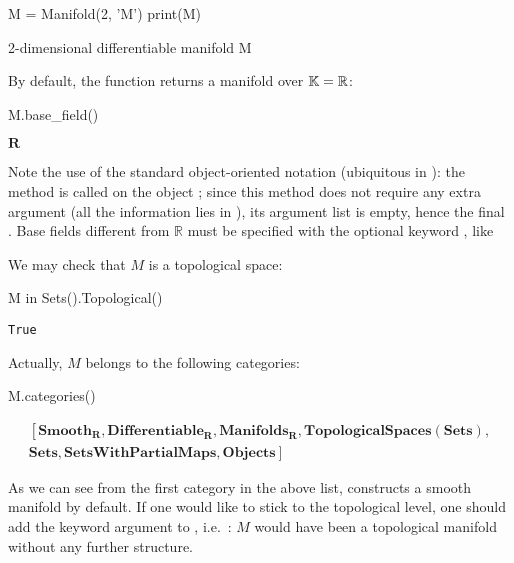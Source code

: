 \begin{NBin}
M = Manifold(2, 'M')
print(M)
\end{NBin}
\begin{NBprint}
2-dimensional differentiable manifold M
\end{NBprint}
By default, the function  returns a manifold over $\mathbb{K}=\mathbb{R}$:
\begin{NBin}
M.base_field()
\end{NBin}
\begin{NBout}
$\mathbf{R}$
\end{NBout}
Note the use of the standard object-oriented notation (ubiquitous in
): the method  is called on the object ;
since this method does not require any extra argument (all the information lies
in ), its argument list is empty, hence the final \code{()}.
Base fields different from $\mathbb{R}$
must be specified with the optional keyword , like
\begin{flushleft}
\end{flushleft}
We may check that $M$ is a topological space:
\begin{NBin}
M in Sets().Topological()
\end{NBin}
\begin{NBout}
\texttt{True}
\end{NBout}
Actually, $M$ belongs to the following categories:
\begin{NBin}
M.categories()
\end{NBin}
\begin{NBout}
\vspace{-25pt}  %
\begin{gather*}
\left[\mathbf{Smooth}_{\mathbf{R}}, \mathbf{Differentiable}_{\mathbf{R}}, \mathbf{Manifolds}_{\mathbf{R}}, \mathbf{TopologicalSpaces}(\mathbf{Sets}), \right.
\\ \left. \mathbf{Sets},  \mathbf{SetsWithPartialMaps}, \mathbf{Objects}\right]
\end{gather*}
\end{NBout}
As we can see from the first category in the above list, 
constructs a smooth manifold by default.
If one would like to stick to the topological level, one should add
the keyword argument  to ,
i.e.\ : $M$ would have
been a topological manifold without any further structure.

